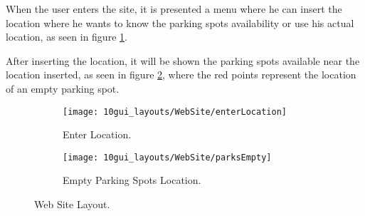 When the user enters the site, it is presented a menu where he can insert the location where he wants to know the parking spots availability or use his actual location, as seen in figure \ref{fig:enterLocation}.


After inserting the location, it will be shown the parking spots available near the location inserted, as seen in figure \ref{fig:parksEmpty}, where the red points represent the location of an empty parking spot.


\begin{figure}[H]
	\centering
	\begin{subfigure}{.5\textwidth}
		\centering
		\texttt{[image: 10gui\_layouts/WebSite/enterLocation]}
		\caption{Enter Location.}
		\label{fig:enterLocation}
	\end{subfigure}%
	\begin{subfigure}{.5\textwidth}
		\centering
		\texttt{[image: 10gui\_layouts/WebSite/parksEmpty]}
		\caption{Empty Parking Spots Location.}
		\label{fig:parksEmpty}
	\end{subfigure}
	\caption{Web Site Layout.}
	\label{fig:webSite}
\end{figure}